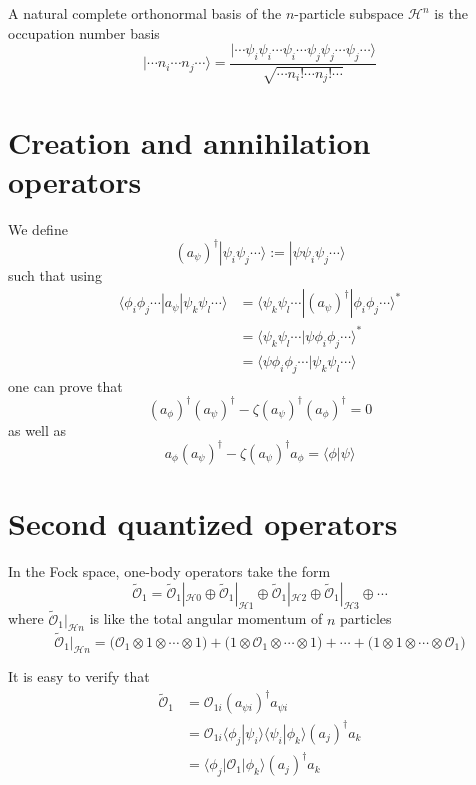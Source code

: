 \documentclass[12pt, oneside]{book}
\begin{document}
A natural complete orthonormal basis of the $n$-particle subspace $\mathcal{H}^n$ is the occupation number basis
\[
|\cdots n_i\cdots n_j\cdots\rangle=\frac{|\cdots\psi_i\psi_i\cdots\psi_i\cdots\psi_j\psi_j\cdots\psi_j\cdots\rangle}{\sqrt{\cdots n_i!\cdots n_j!\cdots}}
\]

\section*{Creation and annihilation operators}
We define
\[
(a_{\psi})^{\dagger}|\psi_i\psi_j\cdots\rangle:=|\psi\psi_i\psi_j\cdots\rangle
\]
such that using
\begin{align*}
\langle\phi_i\phi_j\cdots|a_{\psi}|\psi_k\psi_l\cdots\rangle
&=\langle\psi_k\psi_l\cdots|(a_{\psi})^{\dagger}|\phi_i\phi_j\cdots\rangle^*\\
&=\langle\psi_k\psi_l\cdots|\psi\phi_i\phi_j\cdots\rangle^*\\
&=\langle\psi\phi_i\phi_j\cdots|\psi_k\psi_l\cdots\rangle
\end{align*}
one can prove that
\[
(a_{\phi})^{\dagger}(a_{\psi})^{\dagger}-\zeta(a_{\psi})^{\dagger}(a_{\phi})^{\dagger}=0
\]
as well as
\[
\boxed{a_{\phi}(a_{\psi})^{\dagger}-\zeta(a_{\psi})^{\dagger}a_{\phi}=\langle\phi|\psi\rangle}
\]

\section*{Second quantized operators}
In the Fock space, one-body operators take the form
\[
\widetilde{\mathcal{O}}_1=\widetilde{\mathcal{O}}_1|_{\mathcal{H}0}\oplus\widetilde{\mathcal{O}}_1|_{\mathcal{H}1}\oplus\widetilde{\mathcal{O}}_1|_{\mathcal{H}2}\oplus\widetilde{\mathcal{O}}_1|_{\mathcal{H}3}\oplus\cdots
\]
where $\widetilde{\mathcal{O}}_1|_{\mathcal{H}n}$ is like the total angular momentum of $n$ particles
\[
\widetilde{\mathcal{O}}_1|_{\mathcal{H}n}=\big(\mathcal{O}_1\otimes1\otimes\cdots\otimes1\big)+\big(1\otimes\mathcal{O}_1\otimes\cdots\otimes1\big)+\cdots+\big(1\otimes1\otimes\cdots\otimes\mathcal{O}_1\big)
\]

It is easy to verify that
\begin{align*}
\widetilde{\mathcal{O}}_1
&=\mathcal{O}_{1i}(a_{\psi i})^{\dagger}a_{\psi i}\\
&=\mathcal{O}_{1i}\langle\phi_j|\psi_i\rangle\langle\psi_i|\phi_k\rangle(a_j)^{\dagger}a_k\\
&=\langle\phi_j|\mathcal{O}_1|\phi_k\rangle(a_j)^{\dagger}a_k
\end{align*}
\end{document}
